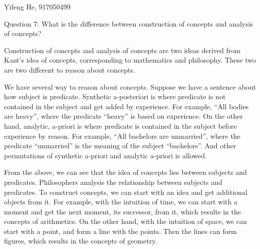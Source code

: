 \documentclass[11pt]{article}
\begin{document}
\begin{center}
    Yifeng He, 917050499
\end{center}

\begin{center}
    Question 7:
    What is the difference between construction of concepts and analysis of concepts?
\end{center}

Construction of concepts and analysis of concepts are two ideas derived from Kant's idea of concepts,
corresponding to mathematics and philosophy.
These two are two different to reason about concepts.

We have several way to reason about concepts.
Suppose we have a sentence about how subject is predicate.
Synthetic a-posteriori is where predicate is not contained in the subject and get added by experience.
For example, ``All bodies are heavy'',
where the predicate ``heavy'' is based on experience.
On the other hand,
analytic, a-priori is where predicate is contained in the subject before experience by reason.
For example, ``All bachelors are unmarried'',
where the predicate ``unmarried'' is the meaning of the subject ``bachelors''.
And other permutations of synthetic a-priori and analytic a-priori is allowed.

From the above, we can see that the idea of concepts lies between subjects and predicates.
Philosophers analysis the relationship between subjects and predicates.
To construct concepts, we can start with an idea and get additional objects from it.
For example, with the intuition of time,
we can start with a moment and get the next moment, its successor, from it,
which results in the concepts of arithmetics.
On the other hand, with the intuition of space,
we can start with a point, and form a line with the points.
Then the lines can form figures, which results in the concepts of geometry.
\end{document}
